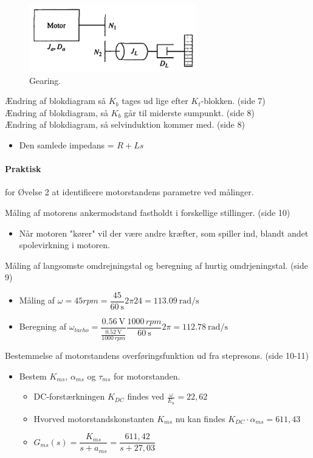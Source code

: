 \documentclass[danish]{article}
\begin{document}
\begin{figure} [H]
	\centering
	\includegraphics[width=0.35\linewidth]{graphics/ovelse2_2}
	\caption{Gearing.}
	\label{fig:ovelse2_2}
\end{figure}

Ændring af blokdiagram så $K_b$ tages ud lige efter $K_t$-blokken. (side 7)\\

Ændring af blokdiagram, så $K_b$ går til miderste sumpunkt. (side 8)\\

Ændring af blokdiagram, så selvinduktion kommer med. (side 8)
\begin{itemize}
	\item Den samlede impedans = $R+L s$
\end{itemize}

\paragraph{Praktisk} for Øvelse 2 at identificere motorstandens parametre ved målinger.

Måling af motorens ankermodstand fastholdt i forskellige stillinger. (side 10)
\begin{itemize}
	\item Når motoren "kører" vil der være andre kræfter, som spiller ind, blandt andet spolevirkning i motoren.
\end{itemize}

Måling af langsomste omdrejningstal og beregning af hurtig omdrjeningstal. (side 9)
\begin{itemize}
	\item Måling af $\omega = 45 rpm = \dfrac{45}{\SI{60}{\second}} 2\pi 24 = \SI{113,09}{\radian\per\second}$
	\item Beregning af $\omega_{tacho} = \dfrac{\SI{0,56}{\volt}}{\frac{\SI{0,52}{\volt}}{1000\,rpm}}\dfrac{1000\,rpm}{\SI{60}{\second}}2\pi = \SI{112,78}{\radian\per\second}$
\end{itemize}

Bestemmelse af motorstandens overføringsfunktion ud fra stepresons. (side 10-11)
\begin{itemize}
	\item Bestem $K_{ms}$, $\alpha_{ms}$ og $\tau_{ms}$  for motorstanden. 
	\begin{itemize}
		\item DC-forstærkningen $K_{DC}$ findes ved $\frac{\omega}{E_a}=22,62$
	\item Hvorved motorstandskonstanten $K_{ms}$ nu kan findes $K_{DC}\cdot \alpha_{ms}=611,43$
	\item $G_{ms}(s) = \dfrac{K_{ms}}{s+a_{ms}} = \dfrac{611,42}{s+27,03}$
	\end{itemize}
\end{itemize}
\end{document}
